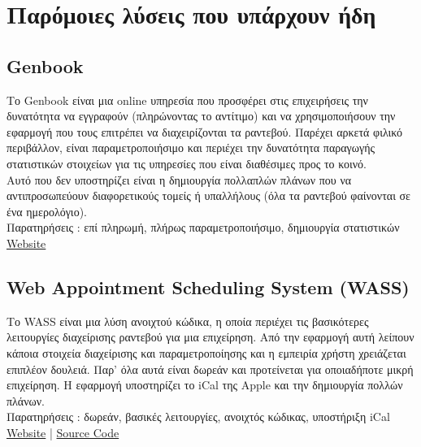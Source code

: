 \documentclass[12pt]{article}
\begin{document}
\section{Παρόμοιες λύσεις που υπάρχουν ήδη}
\subsection{Genbook}
Το Genbook είναι μια online υπηρεσία που προσφέρει στις επιχειρήσεις την δυνατότητα να εγγραφούν (πληρώνοντας το αντίτιμο) και να χρησιμοποιήσουν την εφαρμογή που τους επιτρέπει να διαχειρίζονται τα ραντεβού. Παρέχει αρκετά φιλικό περιβάλλον, είναι παραμετροποιήσιμο και περιέχει την δυνατότητα παραγωγής στατιστικών στοιχείων για τις υπηρεσίες που είναι διαθέσιμες προς το κοινό. 
\\[0.3cm]
Αυτό που δεν υποστηρίζει είναι η δημιουργία πολλαπλών πλάνων που να αντιπροσωπεύουν διαφορετικούς τομείς ή υπαλλήλους (όλα τα ραντεβού φαίνονται σε ένα ημερολόγιο).
\\[0.3cm]
Παρατηρήσεις : επί πληρωμή, πλήρως παραμετροποιήσιμο, δημιουργία στατιστικών
\\[0.3cm]
\href{http://www.genbook.com}{Website}

\subsection{Web Appointment Scheduling System (WASS)}
Το WASS είναι μια λύση ανοιχτού κώδικα, η οποία περιέχει τις βασικότερες λειτουργίες διαχείρισης ραντεβού για μια επιχείρηση. Από την εφαρμογή αυτή λείπουν κάποια στοιχεία διαχείρισης και παραμετροποίησης και η εμπειρία χρήστη χρειάζεται επιπλέον δουλειά. Παρ' όλα αυτά είναι δωρεάν και προτείνεται για οποιαδήποτε μικρή επιχείρηση. Η εφαρμογή υποστηρίζει το iCal της Apple και την δημιουργία πολλών πλάνων.
\\[0.3cm]
Παρατηρήσεις : δωρεάν, βασικές λειτουργίες, ανοιχτός κώδικας, υποστήριξη iCal
\\[0.3cm]
\href{https://wass.princeton.edu/pages/login.page.php}{Website} |
\href{http://sourceforge.net/projects/wass/}{Source Code}
\end{document}
